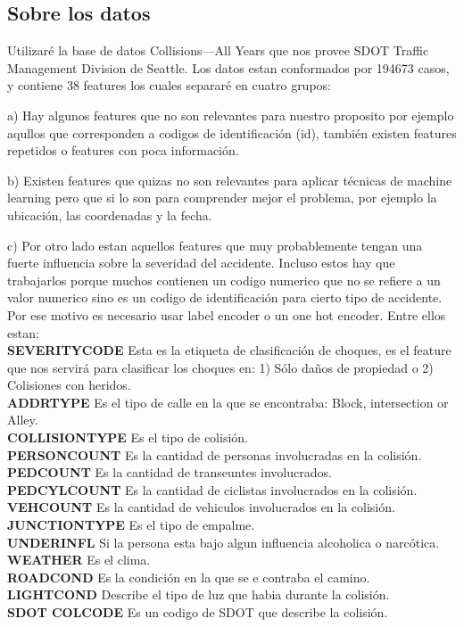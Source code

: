 \documentclass[12pt]{article}
\begin{document}
\subsection*{Sobre los datos}
Utilizaré la base de datos Collisions—All Years que nos provee SDOT Traffic Management Division de Seattle. Los datos estan conformados por 194673 casos, y contiene 38 features los cuales separaré en cuatro grupos:

a) Hay algunos features que no son relevantes para nuestro proposito por ejemplo aqullos que corresponden a codigos de identificación (id), también existen features repetidos o features con poca información. 

b) Existen features que quizas no son relevantes para aplicar técnicas de machine learning pero que si lo son para comprender mejor el problema, por ejemplo la ubicación, las coordenadas y la fecha. 

c) Por otro lado estan aquellos features que muy probablemente tengan una fuerte influencia sobre la severidad del accidente. Incluso estos hay que trabajarlos porque muchos contienen un codigo numerico que no se refiere a un valor numerico sino es un codigo de identificación para cierto tipo de accidente. Por ese motivo es necesario usar label encoder o un one hot encoder. Entre ellos estan:\\
\textbf{SEVERITYCODE} Esta es la etiqueta de clasificación de choques, es el feature que nos servirá para clasificar los choques en: 1) Sólo daños de propiedad o 2) Colisiones con heridos. \\
\textbf{ADDRTYPE} Es el tipo de calle en la que se encontraba: Block, intersection or Alley.\\
\textbf{COLLISIONTYPE} Es el tipo de colisión. \\
\textbf{PERSONCOUNT} Es la cantidad de personas involucradas en la colisión.\\
\textbf{PEDCOUNT} Es la cantidad de transeuntes involucrados. \\
\textbf{PEDCYLCOUNT} Es la cantidad de ciclistas involucrados en la colisión.\\
\textbf{VEHCOUNT} Es la cantidad de vehiculos involucrados en la colisión.\\
\textbf{JUNCTIONTYPE} Es el tipo de empalme.\\
\textbf{UNDERINFL} Si la persona esta bajo algun influencia alcoholica o narcótica.\\
\textbf{WEATHER} Es el clima.\\
\textbf{ROADCOND} Es la condición en la que se e contraba el camino.\\
\textbf{LIGHTCOND} Describe el tipo de luz que habia durante la colisión.\\
\textbf{SDOT COLCODE} Es un codigo de SDOT que describe la colisión.\\
\end{document}
